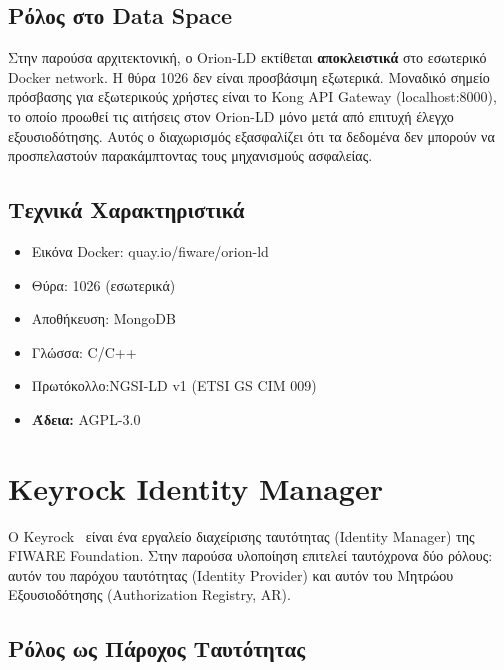 \subsection{Ρόλος στο \textlatin{Data Space}}
\label{subsec:orion-role}

Στην παρούσα αρχιτεκτονική, ο \textlatin{Orion-LD} εκτίθεται
\textbf{αποκλειστικά} στο εσωτερικό \textlatin{Docker network}. Η
θύρα \textlatin{1026} δεν είναι προσβάσιμη εξωτερικά. Μοναδικό σημείο
πρόσβασης για εξωτερικούς χρήστες είναι το \textlatin{Kong API Gateway}
(\textlatin{localhost:8000}), το οποίο προωθεί τις αιτήσεις στον
\textlatin{Orion-LD} μόνο μετά από επιτυχή έλεγχο εξουσιοδότησης. Αυτός
ο διαχωρισμός εξασφαλίζει ότι τα δεδομένα δεν μπορούν να προσπελαστούν
παρακάμπτοντας τους μηχανισμούς ασφαλείας.

\subsection{Τεχνικά Χαρακτηριστικά}
\begin{itemize}
    \item Εικόνα \textlatin{Docker}: \textlatin{quay.io/fiware/orion-ld}
    \item Θύρα: \textlatin{1026} (εσωτερικά)
    \item Αποθήκευση: \textlatin{MongoDB}
    \item Γλώσσα: \textlatin{C/C++}
    \item Πρωτόκολλο:\textlatin{NGSI-LD v1}
    (\textlatin{ETSI GS CIM 009})
    \item \textbf{Άδεια:} \textlatin{AGPL-3.0}
\end{itemize}

\section{\textlatin{Keyrock Identity Manager}}
\label{sec:keyrock}

Ο \textlatin{Keyrock}~\cite{keyrock2023} είναι ένα εργαλείο διαχείρισης
ταυτότητας (\textlatin{Identity Manager}) της \textlatin{FIWARE
Foundation}. Στην παρούσα υλοποίηση επιτελεί ταυτόχρονα δύο ρόλους:
αυτόν του παρόχου ταυτότητας (\textlatin{Identity Provider})
και αυτόν του Μητρώου Εξουσιοδότησης
(\textlatin{Authorization Registry, AR}).

\subsection{Ρόλος ως Πάροχος Ταυτότητας}
\label{subsec:keyrock-idp}

